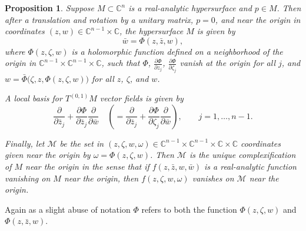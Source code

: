 \documentclass[12pt,openany]{book}
\newcommand{\C}{{\mathbb{C}}}
\newcommand{\sM}{{\mathscr{M}}}
\theoremstyle{plain}
\newtheorem{prop}[thm]{Proposition}
\theoremstyle{remark}
\theoremstyle{definition}
\theoremstyle{exercise}
\theoremstyle{example}
\begin{document}
\begin{prop} \label{prop:complexificationofrasurface}
Suppose $M \subset \C^n$ is a real-analytic hypersurface and $p \in M$.
Then after a translation and rotation by a unitary matrix, $p=0$, and near
the origin in coordinates $(z,w) \in \C^{n-1} \times \C$,
the hypersurface $M$ is given by
\begin{equation*}
\bar{w} = \Phi(z,\bar{z},w) ,
\end{equation*}
where $\Phi(z,\zeta,w)$ is a holomorphic function defined on a neighborhood of the origin
in $\C^{n-1} \times \C^{n-1} \times \C$,
such that
$\Phi$,
$\frac{\partial \Phi}{\partial z_j}$,
$\frac{\partial \Phi}{\partial \zeta_j}$
vanish at the origin for all $j$,
and $w = \bar{\Phi}\bigl(\zeta,z,\Phi(z,\zeta,w)\bigr)$
for all $z$, $\zeta$, and $w$.

A local basis for $T^{(0,1)} M$ vector fields is given by
\begin{equation*}
\frac{\partial}{\partial \bar{z}_j}
+\frac{\partial \Phi}{\partial \bar{z}_j} \frac{\partial}{\partial \bar{w}} 
\quad
\left(
=
\frac{\partial}{\partial \bar{z}_j}
+\frac{\partial \Phi}{\partial \zeta_j} \frac{\partial}{\partial \bar{w}} 
\right)
,
\qquad j=1,\ldots,n-1.
\end{equation*}

Finally, let $\sM$ be the set in
$(z,\zeta,w,\omega) \in \C^{n-1} \times \C^{n-1} \times \C \times \C$
coordinates given near the origin 
by $\omega = \Phi(z,\zeta,w)$.
Then $\sM$ is the unique \emph{complexification}
of $M$
near the origin in the sense that if $f(z,\bar{z},w,\bar{w})$
is a real-analytic function vanishing on $M$ near the origin, then 
$f(z,\zeta,w,\omega)$ vanishes on $\sM$ near the origin.
\end{prop}

Again as a slight abuse of notation $\Phi$ refers to both the function
$\Phi(z,\zeta,w)$ and $\Phi(z,\bar{z},w)$.
\end{document}
